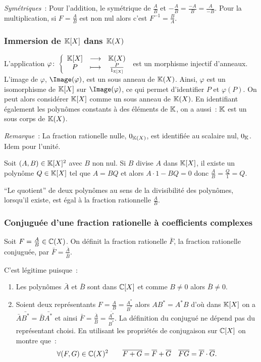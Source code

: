 \emph{Symétriques}~: Pour l'addition, le symétrique de $\frac{A}{B}$ et $-\frac{A}{B}=\frac{-A}{B}=\frac{A}{-B}$. Pour la multiplication, si $F=\frac{A}{B}$ est non nul alors c'est $F^{-1}=\frac{B}{A}$.

\subsubsection{Immersion de $\mathbb{K}[X]$ dans $\mathbb{K}(X)$} 
L'application $\varphi\colon \left\{\begin{array}{ccc} \mathbb{K}[X] & \longrightarrow &\mathbb{K}(X)\\ P & \longmapsto & \frac{P}{1_{\mathbb{K}[X]}} \end{array} \right.$ est un morphisme injectif d'anneaux. L'image de $\varphi$, $\Image(\varphi)$, est un sous anneau de $\mathbb{K}(X)$. Ainsi, $\varphi$ est un isomorphisme de $\mathbb{K}[X]$ sur $\Image(\varphi)$, ce qui permet d'identifier $P$ et $\varphi(P)$. On peut alors considérer $\mathbb{K}[X]$ comme un sous anneau de $\mathbb{K}(X)$. En identifiant également les polynômes constants à des éléments de $\mathbb{K}$, on a aussi~: $\mathbb{K}$ est un sous corps de $\mathbb{K}(X)$.

\emph{Remarque}~: La fraction rationelle nulle, $0_{\mathbb{K}(X)}$, est identifiée au scalaire nul, $0_{\mathbb{K}}$. Idem pour l'unité.

Soit $(A,B) \in \mathbb{K}[X]^2$ avec $B$ non nul. Si $B$ divise $A$ dans $\mathbb{K}[X]$, il existe un polynôme $Q \in \mathbb{K}[X]$ tel que $A=BQ$ et alors $A\cdot 1-BQ=0$ donc $\frac{A}{B}=\frac{Q}{1}=Q$.

``Le quotient'' de deux polynômes au sens de la divisibilité des polynômes, lorsqu'il existe, est égal à la fraction rationnelle $\frac{A}{B}$.

\subsubsection{Conjuguée d'une fraction rationelle à coefficients complexes}

\begin{defdef}
  Soit $F=\frac{A}{B} \in \mathbb{C}(X)$. On définit la fraction rationelle $\bar{F}$, la fraction rationelle conjuguée, par $\bar{F}=\frac{\bar{A}}{\bar{B}}$.
\end{defdef}

C'est légitime puisque~:
\begin{enumerate}
\item Les polynômes $\bar{A}$ et $\bar{B}$ sont dans $\mathbb{C}[X]$ et comme $B \neq 0$ alors $\bar{B} \neq 0$.
\item Soient deux représentants $F=\frac{A}{B}=\frac{A^*}{B^*}$ alors $AB^*=A^*B$ d'où dans $\mathbb{K}[X]$ on a $\bar{A}\bar{B^*}=\bar{B}\bar{A^*}$ et ainsi $\bar{F}=\frac{\bar{A}}{\bar{B}}=\frac{\bar{A^*}}{\bar{B^*}}$. La définition du conjugué ne dépend pas du représentant choisi. En utilisant les propriétés de conjugaison sur $\mathbb{C}[X]$ on montre que~:
  \begin{equation}
    \forall (F,G) \in \mathbb{C}(X)^2 \qquad \overline{F+G}=\overline{F}+\overline{G} \quad \overline{FG}=\overline{F} \cdot \overline{G}.
  \end{equation}
\end{enumerate}

